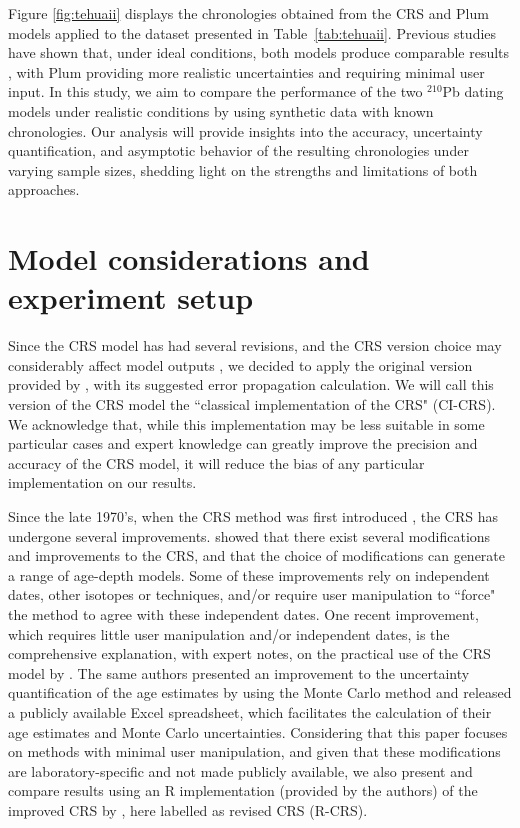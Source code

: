 \documentclass [10pt] {article}
\begin{document}
Figure \ref{fig:tehuaii} displays the chronologies obtained from the CRS and Plum models applied to the dataset presented in Table~\ref{tab:tehuaii}. Previous studies have shown that, under ideal conditions, both models produce comparable results \citep{Aquino2020}, with Plum providing more realistic uncertainties and requiring minimal user input. In this study, we aim to compare the performance of the two $^{210}$Pb dating models under realistic conditions by using synthetic data with known chronologies. Our analysis will provide insights into the accuracy, uncertainty quantification, and asymptotic behavior of the resulting chronologies under varying sample sizes, shedding light on the strengths and limitations of both approaches.


\section{Model considerations and experiment setup}\label{sec:exp_setup}

Since the CRS model has had several revisions, and the CRS version choice may considerably affect model outputs \citep{Barsanti2020}, we decided to apply the original version provided by \citet{Appleby2001}, with its suggested error propagation calculation.  We will call this version of the CRS model the ``classical implementation of the CRS" (CI-CRS). 
We acknowledge that, while this implementation may be less suitable in some particular cases and expert knowledge can greatly improve the precision and accuracy of the CRS model, it will reduce the bias of any particular implementation on our results.


Since the late 1970's, when the CRS method was first introduced \citep{Appleby1978,Robbins1978}, the CRS has undergone several improvements.
\citet{Barsanti2020} showed that there exist several modifications and improvements to the CRS, and that the choice of modifications can generate a range of age-depth models.
Some of these improvements rely on independent dates, other isotopes or techniques, and/or require user manipulation to ``force" the method to agree with these independent dates.
One recent improvement, which requires little user manipulation and/or independent dates, is the comprehensive explanation, with expert notes, on the practical use of the CRS model by \citet{Sanchez-Cabeza2012}. 
The same authors presented an improvement to the uncertainty quantification of the age estimates by using the Monte Carlo method \citep{Sanchez-Cabeza2014} and released a publicly available Excel spreadsheet, which facilitates the calculation of their age estimates and Monte Carlo uncertainties. 
Considering that this paper focuses on methods with minimal user manipulation, and given that these modifications are laboratory-specific and not made publicly available, we also present and compare results using an R implementation (provided by the authors) of the improved CRS by \citet{Sanchez-Cabeza2014}, here labelled as revised CRS (R-CRS).
\end{document}
